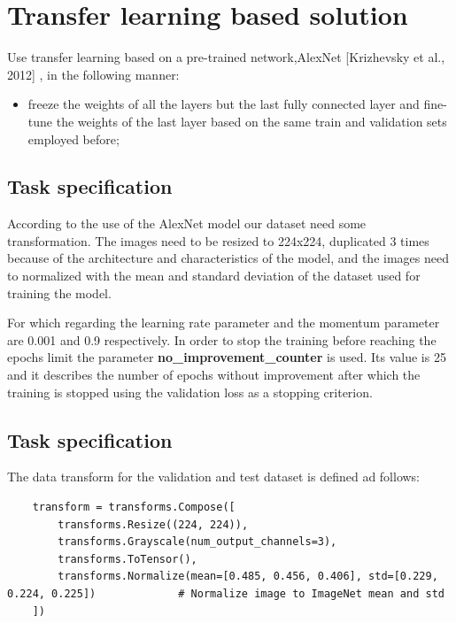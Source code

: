 \documentclass[12pt, a4paper, italian]{scrartcl}
\begin{document}
    
    \newpage
    \section{Transfer learning based solution}
Use transfer learning based on a pre-trained network,AlexNet [Krizhevsky et al., 2012] \cite{Krizhevsky:Krizhevsky}, in the following manner:
\begin{itemize}
	\item freeze the weights of all the layers but the last fully connected layer
and fine-tune the weights of the last layer based on the same train
and validation sets employed before;
\end{itemize} 

    \subsection{Task specification}
According to the use of the AlexNet model our dataset need some transformation.
The images need to be resized to 224x224, duplicated 3 times because of the architecture and characteristics of the model, and the images need to normalized  with the mean and standard deviation of the dataset used for training the model.

For which regarding the learning rate parameter and the momentum parameter are 0.001 and 0.9 respectively.
In order to stop the training before reaching the epochs limit the parameter \textbf{no\_improvement\_counter} is used. Its value is 25 and it describes the number of epochs without improvement after which the training is stopped using the validation loss as a stopping criterion.

\subsection{Task specification}
The data transform for the validation and test dataset is defined ad follows:
    \begin{verbatim} 
    transform = transforms.Compose([
        transforms.Resize((224, 224)),
        transforms.Grayscale(num_output_channels=3),
        transforms.ToTensor(),
        transforms.Normalize(mean=[0.485, 0.456, 0.406], std=[0.229, 0.224, 0.225])             # Normalize image to ImageNet mean and std
    ])
\end{verbatim}
\end{document}
